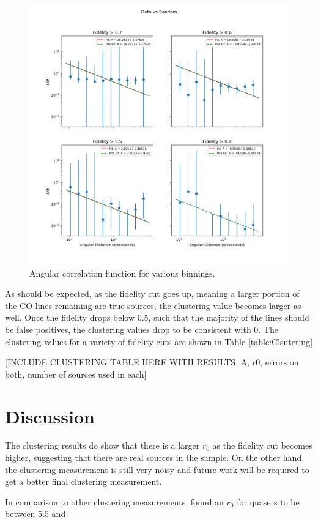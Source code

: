 \begin{figure}[tbp]
\centering \includegraphics[width=120mm]{Fidelity/Log_4Panel_Data_Vs_Random_bin10_NFalse_Num10000.png}
\caption{Angular correlation function for various binnings.}
\label{fig:Angular_binnings}
\end{figure}

As should be expected, as the fidelity cut goes up, meaning a larger portion of the CO lines remaining are true sources, the clustering value becomes larger as well. Once the fidelity drops below 0.5, such that the majority of the lines should be false positives, the clustering values drop to be consistent with 0. The clustering values for a variety of fidelity cuts are shown in Table \ref{table:Clsutering}

[INCLUDE CLUSTERING TABLE HERE WITH RESULTS, A, r0, errors on both, number of sources used in each] \label{table:Clustering}

\section{Discussion}

The clustering results do show that there is a larger $r_0$ as the fidelity cut becomes higher, suggesting that there are real sources in the sample. On the other hand, the clustering measurement is still very noisy and future work will be required to get a better final clustering measurement.

In comparison to other clustering measurements, \cite{hickox2011clustering} found an $r_0$ for quasers to be between 5.5 and 